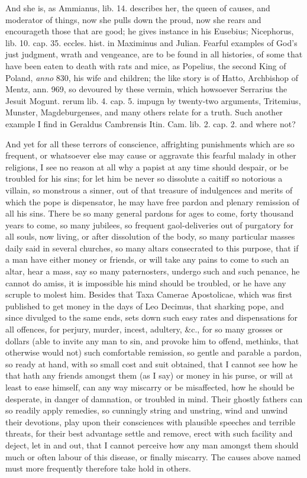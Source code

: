 {And she is, as Ammianus, lib. 14. describes her, the queen of
causes, and moderator of things, now she pulls down the proud, now she
rears and encourageth those that are good; he gives instance in his
Eusebius; Nicephorus, lib. 10. cap. 35. eccles. hist. in Maximinus and
Julian. Fearful examples of God's just judgment, wrath and vengeance,
are to be found in all histories, of some that have been eaten to death
with rats and mice, as Popelius, the second King of Poland, \emph{anno}
830, his wife and children; the like story is of Hatto, Archbishop of
Mentz, ann. 969, so devoured by these vermin, which howsoever Serrarius
the Jesuit Mogunt. rerum lib. 4. cap. 5. impugn by twenty-two
arguments, Tritemius, Munster, Magdeburgenses, and many others
relate for a truth. Such another example I find in Geraldus Cambrensis
Itin. Cam. lib. 2. cap. 2. and where not?

And yet for all these terrors of conscience, affrighting punishments
which are so frequent, or whatsoever else may cause or aggravate this
fearful malady in other religions, I see no reason at all why a papist
at any time should despair, or be troubled for his sins; for let him be
never so dissolute a caitiff so notorious a villain, so monstrous a
sinner, out of that treasure of indulgences and merits of which the
pope is dispensator, he may have free pardon and plenary remission of
all his sins. There be so many general pardons for ages to come, forty
thousand years to come, so many jubilees, so frequent gaol-deliveries
out of purgatory for all souls, now living, or after dissolution of the
body, so many particular masses daily said in several churches, so many
altars consecrated to this purpose, that if a man have either money or
friends, or will take any pains to come to such an altar, hear a mass,
say so many paternosters, undergo such and such penance, he cannot do
amiss, it is impossible his mind should be troubled, or he have any
scruple to molest him. Besides that Taxa Camerae Apostolicae, which was
first published to get money in the days of Leo Decimus, that sharking
pope, and since divulged to the same ends, sets down such easy rates
and dispensations for all offences, for perjury, murder, incest,
adultery, \&c., for so many grosses or dollars (able to invite any man
to sin, and provoke him to offend, methinks, that otherwise would not)
such comfortable remission, so gentle and parable a pardon, so ready at
hand, with so small cost and suit obtained, that I cannot see how he
that hath any friends amongst them (as I say) or money in his purse, or
will at least to ease himself, can any way miscarry or be misaffected,
how he should be desperate, in danger of damnation, or troubled in
mind. Their ghostly fathers can so readily apply remedies, so cunningly
string and unstring, wind and unwind their devotions, play upon their
consciences with plausible speeches and terrible threats, for their
best advantage settle and remove, erect with such facility and deject,
let in and out, that I cannot perceive how any man amongst them should
much or often labour of this disease, or finally miscarry. The causes
above named must more frequently therefore take hold in others.

}
